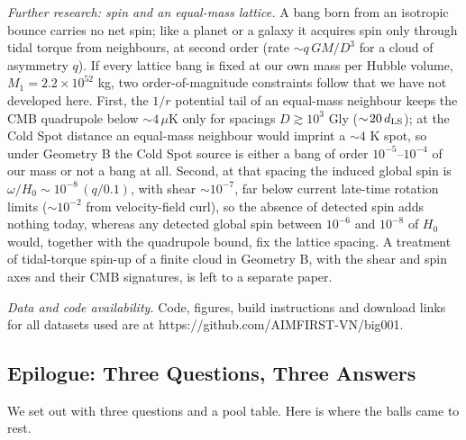 \documentclass[
]{article}
\begin{document}
\emph{Further research: spin and an equal-mass lattice.} A bang born
from an isotropic bounce carries no net spin; like a planet or a galaxy
it acquires spin only through tidal torque from neighbours, at second
order (rate \(\sim q\,GM/D^3\) for a cloud of asymmetry \(q\)). If every
lattice bang is fixed at our own mass per Hubble volume,
\(M_1 = 2.2\times10^{52}\) kg, two order-of-magnitude constraints follow
that we have not developed here. First, the \(1/r\) potential tail of an
equal-mass neighbour keeps the CMB quadrupole below \(\sim\!4\,\mu\)K
only for spacings \(D \gtrsim 10^3\) Gly (\(\sim\!20\,d_{\rm LS}\)); at
the Cold Spot distance an equal-mass neighbour would imprint a
\(\sim\!4\) K spot, so under Geometry B the Cold Spot source is either a
bang of order \(10^{-5}\)--\(10^{-4}\) of our mass or not a bang at all.
Second, at that spacing the induced global spin is
\(\omega/H_0 \sim 10^{-8}\,(q/0.1)\), with shear \(\sim\!10^{-7}\), far
below current late-time rotation limits (\(\sim\!10^{-2}\) from
velocity-field curl), so the absence of detected spin adds nothing
today, whereas any detected global spin between \(10^{-6}\) and
\(10^{-8}\) of \(H_0\) would, together with the quadrupole bound, fix
the lattice spacing. A treatment of tidal-torque spin-up of a finite
cloud in Geometry B, with the shear and spin axes and their CMB
signatures, is left to a separate paper.

\emph{Data and code availability.} Code, figures, build instructions and
download links for all datasets used are at
https://github.com/AIMFIRST-VN/big001.

\hypertarget{epilogue-three-questions-three-answers}{%
\subsection{\texorpdfstring{\textbf{Epilogue: Three Questions, Three
Answers}}{Epilogue: Three Questions, Three Answers}}\label{epilogue-three-questions-three-answers}}

We set out with three questions and a pool table. Here is where the
balls came to rest.
\end{document}
